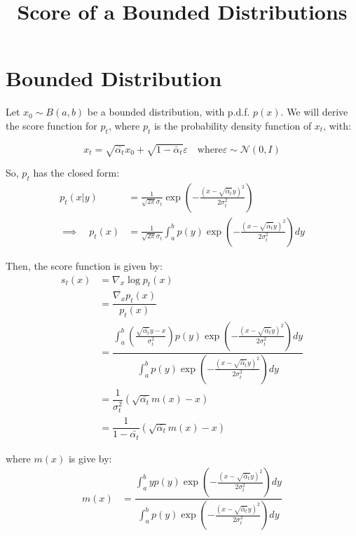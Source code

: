 \documentclass[11pt, a4paper]{article}
\title{Score of a Bounded Distributions}
\begin{document}
\maketitle

\section{Bounded Distribution}
Let $x_0 \sim B(a, b)$ be a bounded distribution, with p.d.f. $p(x)$. We will derive the score function for $p_t$, where $p_t$ is the probability density function of $x_t$, with:

\[
x_t = \sqrt{\bar{\alpha_t}} x_0 + \sqrt{1 - \bar{\alpha}_t} \varepsilon \quad \text{where} \varepsilon \sim \mathcal{N}(0, I)
\]

\noindent So, $p_t$ has the closed form:
\begin{align*}
p_t(x | y) &= \frac{1}{\sqrt{2 \pi} \sigma_t} \exp\left(-\frac{(x - \sqrt{\bar{\alpha}_t} y)^2}{2 \sigma_t^2}\right)\\[1em]
\implies \quad p_t(x) &= \frac{1}{\sqrt{2 \pi} \sigma_t} \int_{a}^{b} p(y) \exp\left(-\frac{(x - \sqrt{\bar{\alpha}_t} y)^2}{2\sigma_t^2}\right) dy
\end{align*}

\vspace{1em}
\noindent Then, the score function is given by:
\begin{align*}
s_t(x) &= \nabla_x \log p_t(x)\\[1em]
&= \dfrac{\nabla_x p_t(x)}{p_t(x)}\\[1em]
&= \dfrac{\displaystyle \int_{a}^{b} \left(\frac{\sqrt{\bar{\alpha_t}}y - x}{\sigma_t^2} \right) p(y) \exp\left(-\frac{(x - \sqrt{\bar{\alpha}_t} y)^2}{2\sigma_t^2}\right) dy}{\displaystyle \int_{a}^{b} p(y) \exp\left(-\frac{(x - \sqrt{\bar{\alpha}_t} y)^2}{2\sigma_t^2}\right) dy}\\[1em]
&= \dfrac{1}{\sigma_t^2} \left(\sqrt{\bar{\alpha_t}}m(x) - x \right)\\[1em]
&= \dfrac{1}{1 - \bar{\alpha_t}} \left(\sqrt{\bar{\alpha_t}}m(x) - x \right)
\end{align*}

\noindent where $m(x)$ is give by:
\begin{align*}
m(x) &= \dfrac{\displaystyle \int_{a}^{b} y p(y) \exp\left(-\frac{(x - \sqrt{\bar{\alpha}_t} y)^2}{2\sigma_t^2}\right) dy}{\displaystyle \int_{a}^{b} p(y) \exp\left(-\frac{(x - \sqrt{\bar{\alpha}_t} y)^2}{2\sigma_t^2}\right) dy}\\[1em]
\end{align*}
\end{document}
